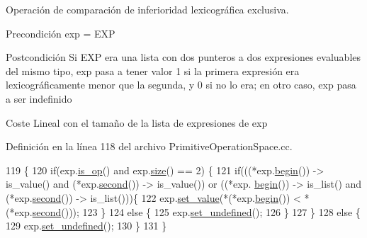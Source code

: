 Operación de comparación de inferioridad lexicográfica exclusiva. 

\begin{DoxyPrecond}{Precondición}
\textquotesingle{}exp\textquotesingle{} = \textquotesingle{}E\+XP\textquotesingle{} 
\end{DoxyPrecond}
\begin{DoxyPostcond}{Postcondición}
Si \textquotesingle{}E\+XP\textquotesingle{} era una lista con dos punteros a dos expresiones evaluables del mismo tipo, \textquotesingle{}exp\textquotesingle{} pasa a tener valor 1 si la primera expresión era lexicográficamente menor que la segunda, y 0 si no lo era; en otro caso, \textquotesingle{}exp\textquotesingle{} pasa a ser indefinido 
\end{DoxyPostcond}
\begin{DoxyParagraph}{Coste}
Lineal con el tamaño de la lista de expresiones de \textquotesingle{}exp\textquotesingle{} 
\end{DoxyParagraph}


Definición en la línea 118 del archivo Primitive\+Operation\+Space.\+cc.


\begin{DoxyCode}
119 \{
120   \textcolor{keywordflow}{if}(exp.\hyperlink{class_expression_a422fb496720b177eaed37a9694613384}{is\_op}() and exp.\hyperlink{class_expression_a0e8980139631cf7bc9fd3bca9d8caddc}{size}() == 2) \{
121     \textcolor{keywordflow}{if}(((*exp.\hyperlink{class_expression_a0ed7767d72f93c9121bb73afead5782a}{begin}()) -> is\_value() and (*exp.\hyperlink{class_expression_ae53f7febf676d564d6393bf2762fc08e}{second}()) -> is\_value()) or ((*exp.
      \hyperlink{class_expression_a0ed7767d72f93c9121bb73afead5782a}{begin}()) -> is\_list() and (*exp.\hyperlink{class_expression_ae53f7febf676d564d6393bf2762fc08e}{second}()) -> is\_list()))\{
122       exp.\hyperlink{class_expression_a307683cc3735bf81d823931aab2d64e0}{set\_value}(*(*exp.\hyperlink{class_expression_a0ed7767d72f93c9121bb73afead5782a}{begin}()) < *(*exp.\hyperlink{class_expression_ae53f7febf676d564d6393bf2762fc08e}{second}()));
123     \}
124     \textcolor{keywordflow}{else} \{
125       exp.\hyperlink{class_expression_a1d3ddfe83d20f47930792807e8b22248}{set\_undefined}();
126     \}
127   \}
128   \textcolor{keywordflow}{else} \{
129     exp.\hyperlink{class_expression_a1d3ddfe83d20f47930792807e8b22248}{set\_undefined}();
130   \}
131 \}
\end{DoxyCode}
